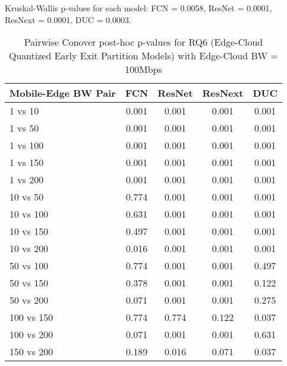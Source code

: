 \begin{table}[h]
\centering
\caption{Pairwise Conover post-hoc p-values for RQ6 (Edge-Cloud Quantized Early Exit Partition Models) with Edge-Cloud BW = 100Mbps}
\label{tab:conover_edge_cloud_quantized_earlyexit_partition_ec100}
\smallskip
Kruskal-Wallis p-values for each model: FCN = 0.0058, ResNet = 0.0001, ResNext = 0.0001, DUC = 0.0003.

\begin{tabular}{lcccc}
\toprule
Mobile-Edge BW Pair & FCN & ResNet & ResNext & DUC \\
\midrule
1 vs 10 & 0.001 & 0.001 & 0.001 & 0.001 \\
1 vs 50 & 0.001 & 0.001 & 0.001 & 0.001 \\
1 vs 100 & 0.001 & 0.001 & 0.001 & 0.001 \\
1 vs 150 & 0.001 & 0.001 & 0.001 & 0.001 \\
1 vs 200 & 0.001 & 0.001 & 0.001 & 0.001 \\
10 vs 50 & 0.774 & 0.001 & 0.001 & 0.001 \\
10 vs 100 & 0.631 & 0.001 & 0.001 & 0.001 \\
10 vs 150 & 0.497 & 0.001 & 0.001 & 0.001 \\
10 vs 200 & 0.016 & 0.001 & 0.001 & 0.001 \\
50 vs 100 & 0.774 & 0.001 & 0.001 & 0.497 \\
50 vs 150 & 0.378 & 0.001 & 0.001 & 0.122 \\
50 vs 200 & 0.071 & 0.001 & 0.001 & 0.275 \\
100 vs 150 & 0.774 & 0.774 & 0.122 & 0.037 \\
100 vs 200 & 0.071 & 0.001 & 0.001 & 0.631 \\
150 vs 200 & 0.189 & 0.016 & 0.071 & 0.037 \\
\bottomrule
\end{tabular}
\end{table}

